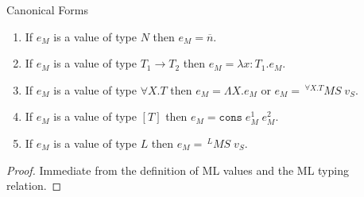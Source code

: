 \begin{mcf}
\label{mcf}
Canonical Forms
\begin{enumerate}
\item If $e_{M}$ is a value of type $N$ then $e_{M}=\overline{n}$.
\item If $e_{M}$ is a value of type $T_{1}\rightarrow T_{2}$ then $e_{M}=\lambda x:T_{1}.e_{M}$.
\item If $e_{M}$ is a value of type $\forall X.T$ then $e_{M}=\Lambda X.e_{M}$ or $e_{M}=\,^{\forall X.T}MS\;v_{S}$.
\item If $e_{M}$ is a value of type $[T]$ then $e_{M}=\mathtt{cons}\;e_{M}^{1}\;e_{M}^{2}$.
\item If $e_{M}$ is a value of type $L$ then $e_{M}=\,^{L}MS\;v_{S}$.
\end{enumerate}
\begin{proof}
Immediate from the definition of ML values and the ML typing relation.
\end{proof}
\end{mcf}